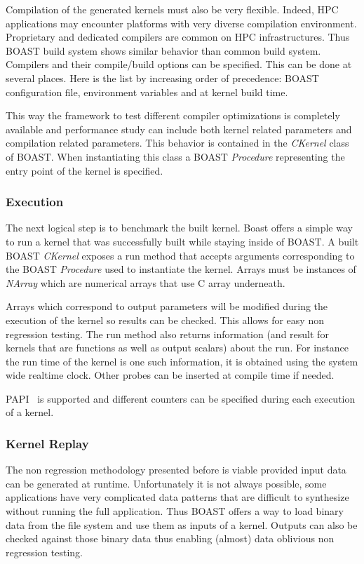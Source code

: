 \documentclass[11pt, a4paper, twoside]{montblanc}
\begin{document}
Compilation of the generated kernels must also be very flexible. Indeed, HPC
applications may encounter platforms with very diverse compilation environment.
Proprietary and dedicated compilers are common on HPC infrastructures. Thus
BOAST build system shows similar behavior than common build system. Compilers
and their compile/build options can be specified. This can be done at several
places. Here is the list by increasing order of precedence: BOAST configuration
file, environment variables and at kernel build time.

This way the framework to test different compiler optimizations is completely
available and performance study can include both kernel related parameters and
compilation related parameters. This behavior is contained in the \emph{CKernel}
class of BOAST. When instantiating this class a BOAST \emph{Procedure}
representing the entry point of the kernel is specified.

  \subsubsection{Execution}

The next logical step is to benchmark the built kernel. Boast offers a simple
way to run a kernel that was successfully built while staying inside of BOAST.
A built BOAST \emph{CKernel} exposes a run method that accepts arguments corresponding
to the BOAST \emph{Procedure} used to instantiate the kernel. Arrays must be
instances of \emph{NArray} which are numerical arrays that use C array
underneath.

Arrays which correspond to output parameters will be modified during the
execution of the kernel so results can be checked. This allows for easy non
regression testing. The run method also returns information (and result for
kernels that are functions as well as output scalars) about the run. For
instance the run time of the kernel is one such information, it is obtained
using the system wide realtime clock. Other probes can be inserted at compile
time if needed.

PAPI~\cite{mucci1999papi} is supported and different counters can be specified
during each execution of a kernel.

  \subsubsection{Kernel Replay}

The non regression methodology presented before is viable provided input data
can be generated at runtime. Unfortunately it is not always possible, some
applications have very complicated data patterns that are difficult to
synthesize without running the full application. Thus BOAST offers a way to load
binary data from the file system and use them as inputs of a kernel. Outputs can
also be checked against those binary data thus enabling (almost) data oblivious
non regression testing.
\end{document}
